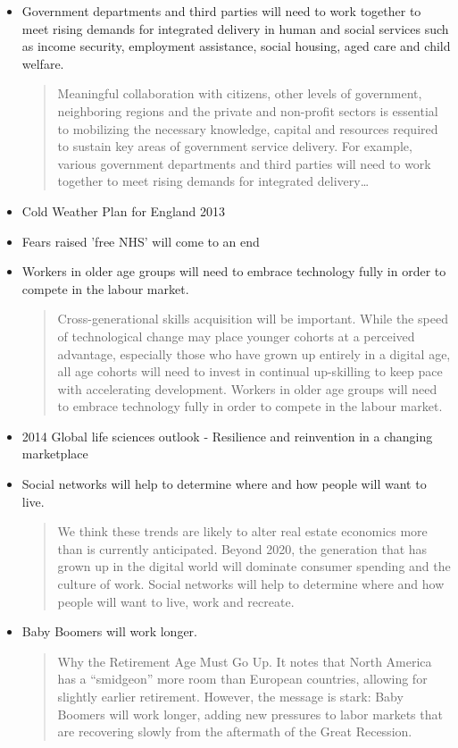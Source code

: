\begin{itemize}
	\item Government departments and third parties will need to work together to meet rising demands for integrated delivery in human and social services such as income security, employment assistance, social housing, aged care and child welfare.
	\begin{quotation}
		Meaningful collaboration with citizens, other levels of government, neighboring regions and the private and non-profit sectors is essential to mobilizing the necessary knowledge, capital and resources required to sustain key areas of government service delivery. For example, various government departments and third parties will need to work together to meet rising demands for integrated delivery\ldots\end{quotation}
	\item Cold Weather Plan  for England 2013
	\item Fears raised 'free NHS' will come to an end
	\item Workers in older age groups will need to embrace technology fully in order to compete in the labour market.
	\begin{quotation}
		Cross-generational skills acquisition will be important. While the speed of technological change may place younger cohorts at a perceived advantage, especially those who have grown up entirely in a digital age, all age cohorts will need to invest in continual up-skilling to keep pace with accelerating development. Workers in older age groups will need to embrace technology fully in order to compete in the labour market.\end{quotation}
	\item 2014 Global life sciences outlook - Resilience and reinvention in a changing marketplace
	\item Social networks will help to determine where and how people will want to live.
	\begin{quotation}
		We think these trends are likely to alter real estate economics more than is currently anticipated. Beyond 2020, the generation that has grown up in the digital world will dominate consumer spending and the culture of work. Social networks will help to determine where and how people will want to live, work and recreate.\end{quotation}
	\item Baby Boomers will work longer.
	\begin{quotation}
		Why the Retirement Age Must Go Up. It notes that North America has a ``smidgeon'' more room than European countries, allowing for slightly earlier retirement. However, the message is stark: Baby Boomers will work longer, adding new pressures to labor markets that are recovering slowly from the aftermath of the Great Recession.\end{quotation}

\end{itemize}
